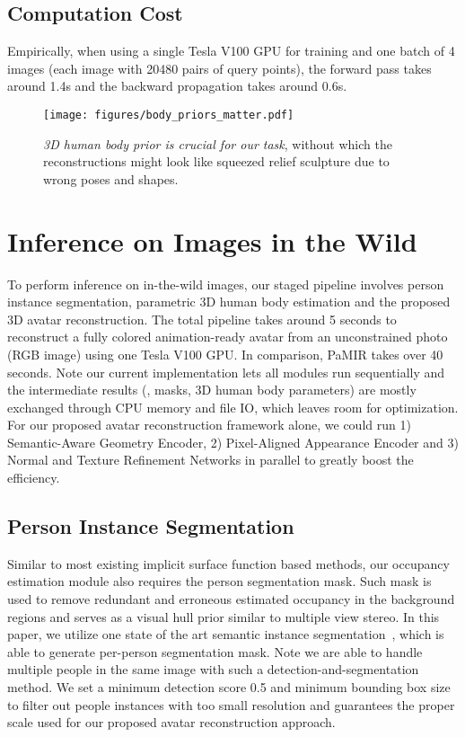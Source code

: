 \documentclass[10pt,twocolumn,letterpaper]{article}
\newcommand{\beforefigcaption}{\vspace{-5mm}}
\newcommand{\afterfigcaption}{\vspace{-5mm}}
\begin{document}
\subsection{Computation Cost}

Empirically, when using a single Tesla V100 GPU for training and one batch of \num{4} images (each image with 20480 pairs of query points), the forward pass takes around 1.4s and the backward propagation takes around 0.6s.


\begin{figure*}[ptb]
\vspace{-30 pt}
\centering
\texttt{[image: figures/body\_priors\_matter.pdf]}
\beforefigcaption
\vspace{+10pt}
\caption{\textit{3D human body prior is crucial for our task}, without which the reconstructions might look like squeezed relief sculpture due to wrong poses and shapes.
}
\afterfigcaption
\label{fig:body_priors_matter}
\end{figure*}

\section{Inference on Images in the Wild}

To perform inference on in-the-wild images, our staged pipeline involves person instance segmentation, parametric 3D human body estimation and the proposed 3D avatar reconstruction. The total pipeline takes around \num{5} seconds to reconstruct a fully colored animation-ready avatar from an unconstrained photo (RGB image) using one Tesla V100 GPU. In comparison, PaMIR \cite{Zerong2020PaMIR} takes over \num{40} seconds. Note our current implementation lets all modules run sequentially and the intermediate results (\eg, masks, 3D human body parameters) are mostly exchanged through CPU memory and file IO, which leaves room for optimization. For our proposed avatar reconstruction framework alone, we could run 1) Semantic-Aware Geometry Encoder, 2) Pixel-Aligned Appearance Encoder and 3) Normal and Texture Refinement Networks in parallel to greatly boost the efficiency. 

\subsection{Person Instance Segmentation}

Similar to most existing implicit surface function based methods, our occupancy estimation module also requires the person segmentation mask. Such mask is used to remove redundant and erroneous estimated occupancy in the background regions and serves as a visual hull prior similar to multiple view stereo. In this paper, we utilize one state of the art semantic instance segmentation~\cite{pointrend20}, which is able to generate per-person segmentation mask. Note we are able to handle multiple people in the same image with such a detection-and-segmentation method. We set a minimum detection score \num{0.5} and minimum bounding box size  to filter out people instances with too small resolution and guarantees the proper scale used for our proposed avatar reconstruction approach.
\end{document}
